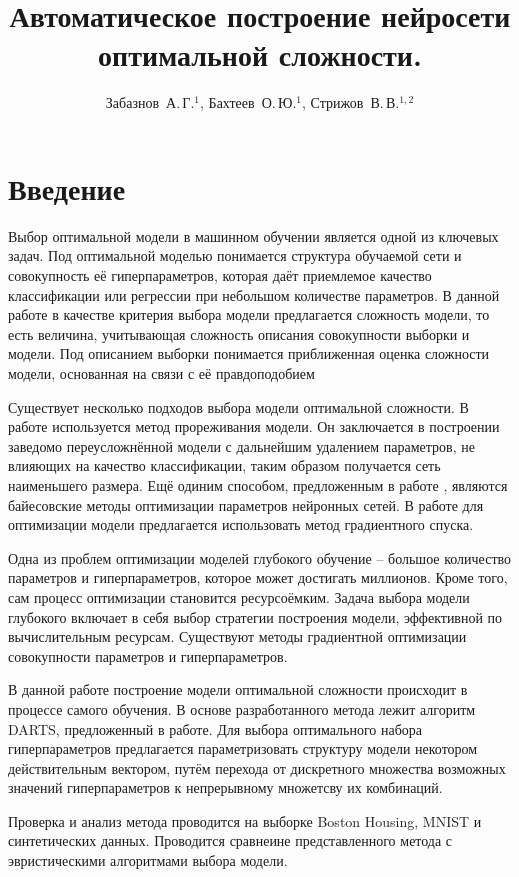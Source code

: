 \documentclass[12pt,twoside]{article}
\title
    [Автоматическое построение нейросети оптимальной сложности ] %
    {Автоматическое построение нейросети оптимальной сложности. }
\author
    {Забазнов~А.\,Г.$^1$, Бахтеев~О.\,Ю.$^1$, Стрижов~В.\,В.$^{1, 2}$} %
\begin{document}
\maketitle


\section{Введение}
Выбор оптимальной модели в машинном обучении является одной из ключевых задач.
Под оптимальной моделью понимается структура обучаемой сети и совокупность её гиперпараметров, которая даёт приемлемое качество классификации или регрессии при небольшом количестве параметров. В данной работе в качестве критерия выбора модели предлагается сложность модели, то есть величина, учитывающая сложность описания совокупности выборки и модели. Под описанием выборки понимается приближенная оценка сложности модели, основанная на связи с её правдоподобием\cite{DescriptionLength}

Существует несколько подходов выбора модели оптимальной сложности. В работе \cite{BrainDamage} используется метод прореживания модели. Он заключается в построении заведомо переусложнённой модели с дальнейшим удалением параметров, не влияющих на качество классификации, таким образом получается сеть наименьшего размера. Ещё одиним способом, предложенным в работе \cite{BayesOptim}, являются байесовские методы оптимизации параметров нейронных сетей. В работе\cite{GradientOptim} для оптимизации модели предлагается использовать метод градиентного спуска. 

Одна из проблем оптимизации моделей глубокого обучение -- большое количество параметров и гиперпараметров, которое может достигать миллионов. Кроме того, сам процесс оптимизации становится ресурсоёмким. Задача выбора модели глубокого включает в себя выбор стратегии построения модели, эффективной по вычислительным ресурсам. Существуют методы градиентной оптимизации совокупности параметров и гиперпараметров.

В данной работе построение модели оптимальной сложности происходит в процессе самого обучения. В основе разработанного метода лежит алгоритм DARTS, предложенный в работе\cite{DARTS}. Для выбора оптимального набора гиперпараметров предлагается  параметризовать структуру
модели некотором действительным вектором, путём перехода от дискретного множества возможных значений гиперпараметров к непрерывному множетсву их комбинаций.

Проверка и анализ метода проводится на выборке Boston Housing\cite{Boston}, MNIST\cite{MNIST} и синтетических данных. Проводится сравнеине представленного метода с эвристическими алгоритмами выбора модели.
\end{document}
